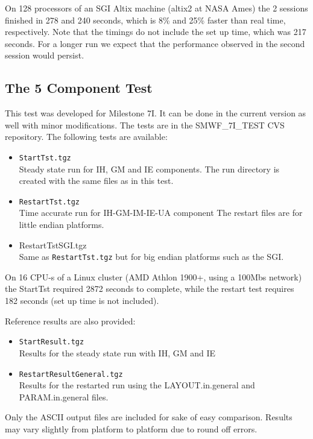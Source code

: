 \documentclass[twoside,10pt]{article}
\begin{document}
On 128 processors of an SGI Altix machine (altix2 at NASA Ames) 
the 2 sessions finished in 278 and 240 seconds, 
which is 8\% and 25\% faster than real time, respectively.
Note that the timings do not include the set up time, which was 217 seconds.
For a longer run we expect that the performance observed in the
second session would persist.

\subsection{The 5 Component Test}

This test was developed for Milestone 7I. 
It can be done in the current version as well with minor modifications. 
The tests are in the SMWF\_7I\_TEST CVS repository.  
The following tests are available:
\begin{itemize}
\item {\tt StartTst.tgz}\\
      Steady state run for IH, GM and IE components.
      The run directory is created with the same files as in
      this test.

\item {\tt RestartTst.tgz}\\
      Time accurate run for IH-GM-IM-IE-UA component
      The restart files are for little endian platforms.

\item {RestartTstSGI.tgz}\\
      Same as {\tt RestartTst.tgz} 
      but for big endian platforms such as the SGI.
\end{itemize}
On 16 CPU-s of a Linux cluster (AMD Athlon 1900+, using a 100Mbs
network) the StartTst required 2872 seconds to complete, while the
restart test requires 182 seconds (set up time is not included).

Reference results are also  provided:
\begin{itemize}
\item {\tt StartResult.tgz}\\
       Results for the steady state run with IH, GM and IE

\item {\tt RestartResultGeneral.tgz}\\
      Results for the restarted run using the 
      LAYOUT.in.general and PARAM.in.general files.
\end{itemize}
Only the ASCII output files are included for sake of easy comparison.
Results may vary slightly from platform to platform due to round off errors.
\end{document}

